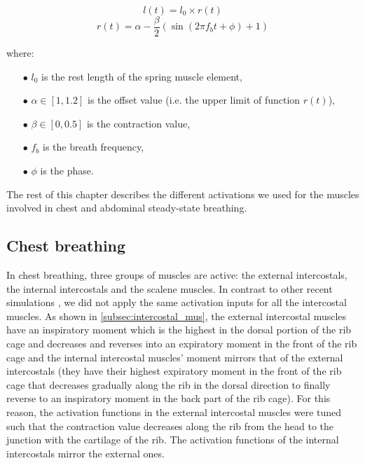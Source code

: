 \begin{equation}l(t) = l_{0} \times r(t) \end{equation}
\begin{equation}\label{eq:sine_input}r(t) = \alpha - \frac{\beta}{2}\left(\sin\left(2 \pi f_{b} t + \phi\right) + 1\right) \end{equation}

where:
\begin{itemize}
\item[$\bullet$] $l_{0}$ is the rest length of the spring muscle element,
\item[$\bullet$] $\alpha \in [1, 1.2]$ is the offset value (i.e. the upper limit of function $r(t)$),
\item[$\bullet$] $\beta \in [0, 0.5]$ is the contraction value,
\item[$\bullet$] $f_{b}$ is the breath frequency,
\item[$\bullet$] $\phi$ is the phase.
\end{itemize}

The rest of this chapter describes the different activations we used for the muscles involved in chest and abdominal steady-state breathing.
	
\subsection{Chest breathing}
In chest breathing, three groups of muscles are active: the external intercostals, the internal intercostals and the scalene muscles. In contrast to other recent simulations \cite{dilorenzo2009breathing, lee2008biomechanical, veltkamp2009physiological}, we did not apply the same activation inputs for all the intercostal muscles. As shown in \ref{subsec:intercostal_mus}, the external intercostal muscles have an inspiratory moment which is the highest in the dorsal portion of the rib cage and decreases and reverses into an expiratory moment in the front of the rib cage and the internal intercostal muscles' moment mirrors that of the external intercostals (they have their highest expiratory moment in the front of the rib cage that decreases gradually along the rib in the dorsal direction to finally reverse to an inspiratory moment in the back part of the rib cage). For this reason, the activation functions in the external intercostal muscles were tuned such that the contraction value decreases along the rib from the head to the junction with the cartilage of the rib. The activation functions of the internal intercostals mirror the external ones.


